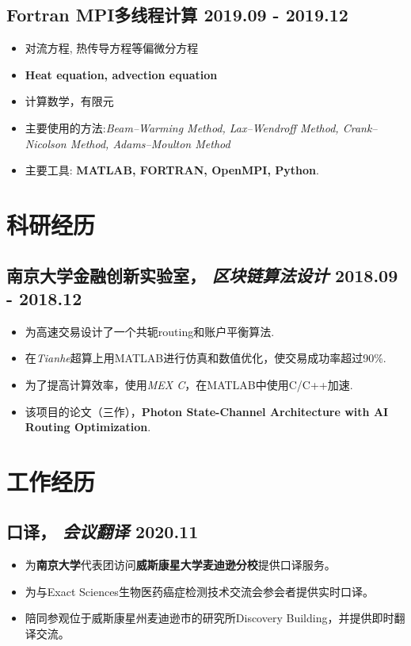 \documentclass[11pt]{article}
\newcommand{\datedsubsection}[2]{%
    \subsection[#1]{#1 \hfill #2}%
}
\begin{document}
\datedsubsection{
    \textbf{Fortran MPI多线程计算}
    }
    {2019.09 - 2019.12}
    \begin{itemize} [parsep=1ex]
        \item 对流方程, 热传导方程等偏微分方程
        \item \textbf{Heat equation, advection equation}
        \item 计算数学，有限元
        \item 主要使用的方法:\textit{Beam–Warming Method, Lax–Wendroff Method, Crank–Nicolson Method, Adams–Moulton Method}
        \item 主要工具: \textbf{MATLAB, FORTRAN, OpenMPI, Python}.
    \end{itemize}


\hspace*{\fill}
\section{\textbf{科研经历}}
\datedsubsection{
    \textbf{南京大学金融创新实验室}，
    \textit{区块链算法设计}
    }
    {2018.09 - 2018.12}
    \begin{itemize} [parsep=1ex]
        \item 为高速交易设计了一个共轭routing和账户平衡算法.
        \item 在\textit{Tianhe}超算上用MATLAB进行仿真和数值优化，使交易成功率超过90\%.
        \item 为了提高计算效率，使用\textit{MEX C}，在MATLAB中使用C/C++加速.
        \item 该项目的论文（三作），\textbf{Photon State-Channel Architecture with AI Routing Optimization}.
    \end{itemize}


\section{\textbf{工作经历}}
\datedsubsection{
    \textbf{口译}，
    \textit{会议翻译}
    }
    {2020.11}
    \begin{itemize} [parsep=1ex]
        \item 为\textbf{南京大学}代表团访问\textbf{威斯康星大学麦迪逊分校}提供口译服务。
        \item 为与Exact Sciences生物医药癌症检测技术交流会参会者提供实时口译。
        \item 陪同参观位于威斯康星州麦迪逊市的研究所Discovery Building，并提供即时翻译交流。
    \end{itemize}
\end{document}
